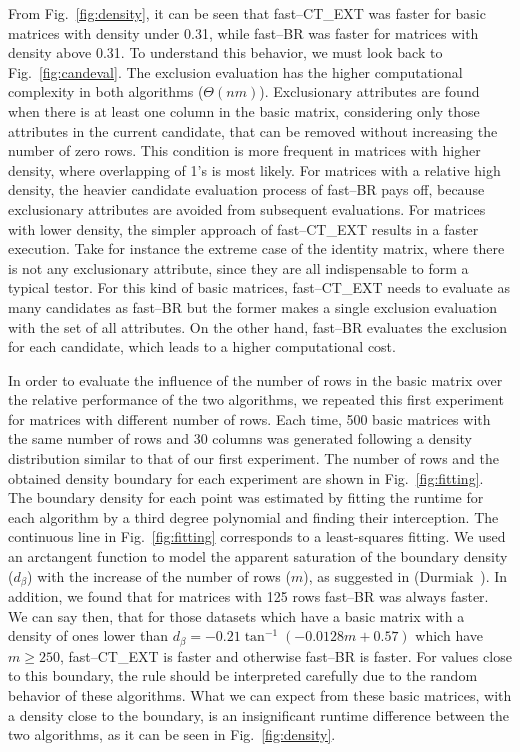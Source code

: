 \documentclass[citeauthoryear]{llncs}
\begin{document}
	From Fig.~\ref{fig:density}, it can be seen that fast--CT\_EXT was faster for basic matrices with density under 0.31, while fast--BR was faster for matrices with density above 0.31. To understand this behavior, we must look back to Fig.~\ref{fig:candeval}. The exclusion evaluation has the higher computational complexity in both algorithms ($\Theta (nm)$). Exclusionary attributes are found when there is at least one column in the basic matrix, considering only those attributes in the current candidate, that can be removed without increasing the number of zero rows. This condition is more frequent in matrices with higher density, where overlapping of 1's is most likely. For matrices with a relative high density, the heavier candidate evaluation process of fast--BR pays off, because exclusionary attributes are avoided from subsequent evaluations. For matrices with lower density, the simpler approach of fast--CT\_EXT results in a faster execution. Take for instance the extreme case of the identity matrix, where there is not any exclusionary attribute, since they are all indispensable to form a typical testor. For this kind of basic matrices, fast--CT\_EXT needs to evaluate as many candidates as fast--BR but the former makes a single exclusion evaluation with the set of all attributes. On the other hand, fast--BR evaluates the exclusion for each candidate, which leads to a higher computational cost.
	
	In order to evaluate the influence of the number of rows in the basic matrix over the relative performance of the two algorithms, we repeated this first experiment for matrices with different number of rows. Each time, 500 basic matrices with the same number of rows and 30 columns was generated following a density distribution similar to that of our first experiment. The number of rows and the obtained density boundary for each experiment are shown in Fig.~\ref{fig:fitting}. The boundary density for each point was estimated by fitting the runtime for each algorithm by a third degree polynomial and finding their interception. The continuous line in Fig.~\ref{fig:fitting} corresponds to a least-squares fitting. We used an arctangent function to model the apparent saturation of the boundary density ($d_\beta$) with the increase of the number of rows ($m$), as suggested in (Durmiak~\cite{Durmiak}). In addition, we found that for matrices with 125 rows fast--BR was always faster. We can say then, that for those datasets which have a basic matrix with a density of ones lower than $d_\beta=-0.21\tan^{-1}(-0.0128m+0.57)$ which have $m\geq250$, fast--CT\_EXT is faster and otherwise fast--BR is faster. For values close to this boundary, the rule should be interpreted carefully due to the random behavior of these algorithms. What we can expect from these basic matrices, with a density close to the boundary, is an insignificant runtime difference between the two algorithms, as it can be seen in Fig.~\ref{fig:density}.
%
\end{document}
